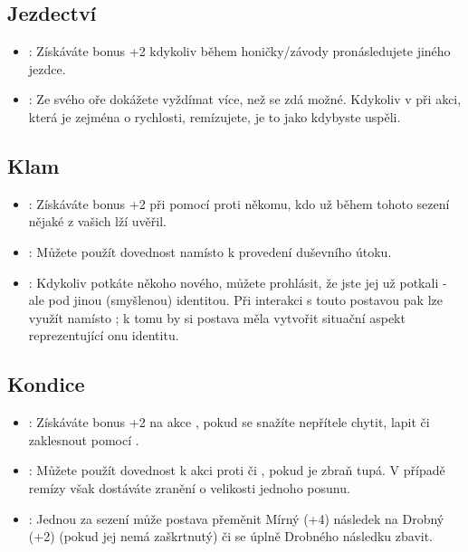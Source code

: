 \subsection{Jezdectví}
\label{sec:trik-jezd}
\begin{itemize}
  
\item{}:
\label{sec:jezdectvi-kliste}
Získáváte bonus +2 kdykoliv během honičky/závody pronásledujete jiného jezdce.

\item{}:
\label{sec:jezdectvi-hyje}
Ze svého oře dokážete vyždímat více, než se zdá možné. Kdykoliv v při akci, která je zejména o rychlosti, remízujete, je to jako kdybyste uspěli.
\end{itemize}

\subsection{Klam}
\label{sec:trik-klam}

\begin{itemize}
\item{}:
\label{sec:klam-lez}
Získáváte bonus +2 při  pomocí  proti někomu, kdo už během tohoto sezení nějaké z vašich lží uvěřil.

\item{}:
\label{sec:klam-mysl}
Můžete použít dovednost  namísto  k provedení duševního útoku.

\item{}:
\label{sec:klam-muz}
Kdykoliv potkáte někoho nového, můžete prohlásit, že jste jej už potkali - ale pod jinou (smyšlenou) identitou. Při interakci s touto postavou pak lze využít  namísto ; k tomu by si postava měla vytvořit situační aspekt reprezentující onu identitu.
\end{itemize}

\subsection{Kondice}
\label{sec:trik-kondice}

\begin{itemize}
\item{}:
\label{sec:kondice-zapas}
Získáváte bonus +2 na akce , pokud se snažíte nepřítele chytit, lapit či zaklesnout pomocí .

\item{}:
\label{sec:kondice-drsnak}
Můžete použít dovednost  k akci  proti  či , pokud je zbraň tupá. V případě remízy však dostáváte zranění o velikosti jednoho posunu.

\item{}:
\label{sec:kondice-nezdolny}
Jednou za sezení může postava přeměnit Mírný (+4) následek na Drobný (+2) (pokud jej nemá zaškrtnutý) či se úplně Drobného následku zbavit.
\end{itemize}

